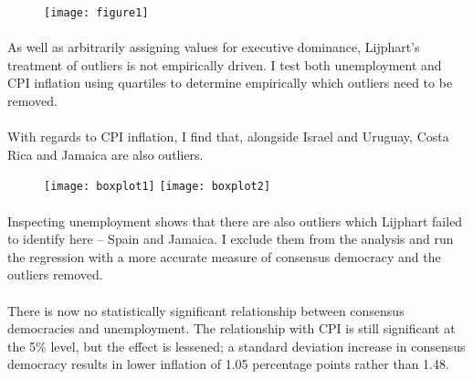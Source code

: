 \documentclass[11pt, oneside]{article}   	%
\let\oldparagraph\paragraph
\renewcommand{\paragraph}[1]{\oldparagraph{#1}\mbox{}}
\begin{document}
\begin{figure}[H]
\texttt{[image: figure1]}
\end{figure}

\paragraph{} 
As well as arbitrarily assigning values for executive dominance, Lijphart’s treatment of outliers is not empirically driven. I test both unemployment and CPI inflation using quartiles to determine empirically which outliers need to be removed.

\paragraph{}
With regards to CPI inflation, I find that, alongside Israel and Uruguay, Costa Rica and Jamaica are also outliers.

\begin{figure}[h]
\texttt{[image: boxplot1]}
\texttt{[image: boxplot2]}
\end{figure}

\paragraph{}
Inspecting unemployment shows that there are also outliers which Lijphart failed to identify here – Spain and Jamaica. I exclude them from the analysis and run the regression with a more accurate measure of consensus democracy and the outliers removed. 

\paragraph{}
There is now no statistically significant relationship between consensus democracies and unemployment. The relationship with CPI is still significant at the 5\% level, but the effect is lessened; a standard deviation increase in consensus democracy results in lower inflation of 1.05 percentage points rather than 1.48.
\end{document}
